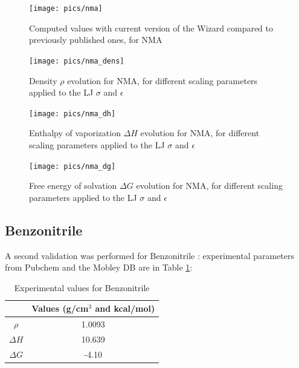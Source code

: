 \documentclass[12pt,a4paper]{article}
\begin{document}
\begin{figure}[h!]
\centering
\texttt{[image: pics/nma]}
\caption{Computed values with current version of the Wizard compared to previously published ones, 
for NMA}
\label{nma_val}
\end{figure}

\begin{figure}[h!]
\centering
\texttt{[image: pics/nma\_dens]}
\caption{Density $\rho$ evolution for NMA, for different scaling parameters applied to the LJ 
$\sigma$ and $\epsilon$}
\label{nma_dens}
\end{figure}

\begin{figure}[h!]
\centering
\texttt{[image: pics/nma\_dh]}
\caption{Enthalpy of vaporization $\Delta H$ evolution for NMA, for different scaling parameters 
applied to the LJ $\sigma$ and $\epsilon$}
\label{nma_dh}
\end{figure}

\begin{figure}[h!]
\centering
\texttt{[image: pics/nma\_dg]}
\caption{Free energy of solvation $\Delta G$ evolution for NMA, for different scaling parameters 
applied to the LJ $\sigma$ and $\epsilon$}
\label{nma_dg}
\end{figure}

\clearpage


\subsection{Benzonitrile}


A second validation was performed for Benzonitrile : experimental parameters from Pubchem and 
the Mobley DB are in Table \ref{tab:benzonitrile_ref}:\\

\begin{table}[h!]
\centering
\begin{tabular}{|c|c|}
\hline  & Values (g/cm$^3$ and kcal/mol) \\ 
\hline $\rho$ & 1.0093 \\ 
\hline $\Delta H$ & 10.639 \\ 
\hline $\Delta G$ & -4.10 \\ 
\hline 
\end{tabular} 
\caption{Experimental values for Benzonitrile}
\label{tab:benzonitrile_ref}
\end{table}
\end{document}
